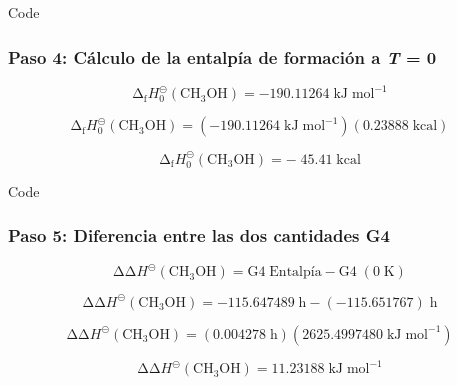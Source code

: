 \documentclass{beamer}
\begin{document}
\begin{frame}[fragile]{Code}
\frametitle{Paso 4: Cálculo de la entalpía de formación a \textit{T} = 0}

\begin{equation}
	\mathrm{\Delta}_\mathrm{{f}} H^{\circleddash}_{0}\mathrm{(CH_3OH) = -190.11264\; kJ\;mol^{-1}}
\label{eq:4.9}
\end{equation}

\begin{equation}
	\mathrm{\Delta}_\mathrm{{f}} H^{\circleddash}_{0}\mathrm{(CH_3OH) = (-190.11264\; kJ\;mol^{-1})(0.23888\; kcal)}
\label{eq:4.10}
\end{equation}

\begin{equation}
	\mathrm{\Delta}_\mathrm{{f}} H^{\circleddash}_{0}\mathrm{(CH_3OH) = -\;45.41\;kcal}
\label{eq:4.11}
\end{equation}
\end{frame}
\begin{frame}[fragile]{Code}
\frametitle{Paso 5: Diferencia entre las  dos cantidades G4}

\begin{equation}
	\mathrm{\Delta \Delta} H^{\circleddash}\mathrm{(CH_3OH) = G4\;\textrm{Entalpía} - G4\;(0\;K)}
\label{eq:4.12}
\end{equation}

\begin{equation}
	\mathrm{\Delta \Delta} H^{\circleddash}\mathrm{(CH_3OH) = -115.647489\;\mathrm{h} - (-115.651767)\;h}
\label{eq:4.13}
\end{equation}

\begin{equation}
	\mathrm{\Delta \Delta} H^{\circleddash}\mathrm{(CH_3OH) = (0.004278\;\mathrm{h})(2625.4997480\; kJ\;mol^{-1})}
\label{eq:4.14}
\end{equation}

\begin{equation}
	\mathrm{\Delta \Delta} H^{\circleddash}\mathrm{(CH_3OH) = 11.23188\;kJ\;mol^{-1}}
\label{eq:4.15}
\end{equation}
\end{frame}
\end{document}
